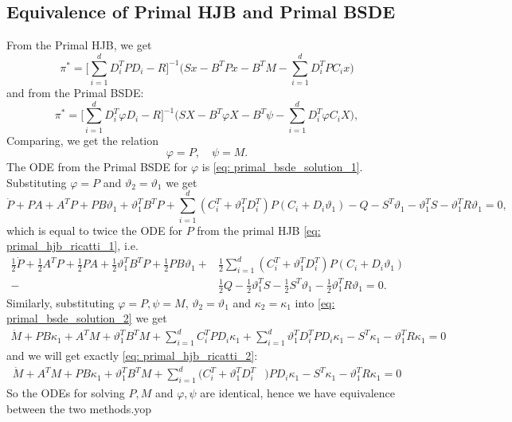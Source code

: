 \subsection{Equivalence of Primal HJB and Primal BSDE}
From the Primal HJB, we get
\begin{equation}
    \pi^\ast = \bigg[\sum_{i=1}^d D_i^T P D_i - R\bigg]^{-1} \bigg(S x - B^T P x - B^T M - \sum_{i=1}^d D_i^T P C_i x\bigg)
\end{equation}
and from the Primal BSDE:
\begin{equation}
    \pi^\ast = \bigg[ \sum_{i=1}^d D_i^T \varphi D_i -  R \bigg]^{-1} \bigg( S X - B^T \varphi X - B^T \psi - \sum_{i=1}^d D_i^T \varphi C_i X \bigg),
\end{equation}
Comparing, we get the relation
\begin{equation*}
    \varphi = P, \quad \psi = M. 
\end{equation*}
The ODE from the Primal BSDE for $\varphi$ is \eqref{eq: primal_bsde_solution_1}. Substituting $\varphi = P$ and $\vartheta_2 = \vartheta_1$ we get 
\begin{equation*}
    \dot{P} + P A + A^T P + P B \vartheta_1 + \vartheta_1^T B^T P + \sum_{i=1}^d (C_i^T + \vartheta_1^T D_i^T) P (C_i + D_i \vartheta_1) - Q - S^T \vartheta_1 - \vartheta_1^T S - \vartheta_1^T R \vartheta_1  = 0,
\end{equation*}
which is equal to twice the ODE for $P$ from the primal HJB \eqref{eq: primal_hjb_ricatti_1}, i.e. 
\begin{align*}
    \frac12 \dot{P} + \frac12 A^T P + \frac12 P A + \frac12 \vartheta_1^T B^T P + \frac12 P B \vartheta_1 + &\frac12 \sum_{i=1}^d (C_i^T + \vartheta_1^T D_i^T)P(C_i + D_i \vartheta_1)\\
     -& \frac12 Q - \frac12 \vartheta_1^T S - \frac12 S^T \vartheta_1 - \frac12 \vartheta_1^T R \vartheta_1 = 0.
\end{align*}
Similarly, substituting $\varphi=P, \psi = M$, $\vartheta_2 = \vartheta_1$ and $\kappa_2 = \kappa_1$ into \eqref{eq: primal_bsde_solution_2} we get
\begin{align*}
    \dot{M} + P B \kappa_1 + A^T M + \vartheta_1^T B^T M + \sum_{i=1}^d C_i^T P D_i \kappa_1 + \sum_{i=1}^d \vartheta_1^T D_i^T P D_i \kappa_1 - S^T \kappa_1 - \vartheta_1^T R \kappa_1 = 0
\end{align*}
and we will get exactly \eqref{eq: primal_hjb_ricatti_2}:
\begin{align*}
    \dot{M} + A^T M + P B \kappa_1 + \vartheta_1^T B^T M + \sum_{i=1}^d (C_i^T + \vartheta_1^T D_i^T&)P D_i \kappa_1 -  S^T \kappa_1 - \vartheta_1^T R \kappa_1 = 0 
\end{align*}
So the ODEs for solving $P, M$ and $\varphi, \psi$ are identical, hence we have equivalence between the two methods.yop


